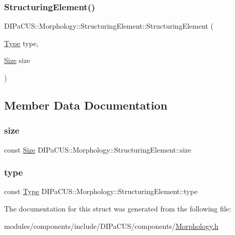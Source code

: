 \subsubsection{\texorpdfstring{Structuring\+Element()}{StructuringElement()}}
{\footnotesize\ttfamily D\+I\+Pa\+C\+U\+S\+::\+Morphology\+::\+Structuring\+Element\+::\+Structuring\+Element (\begin{DoxyParamCaption}\item[{\hyperlink{structDIPaCUS_1_1Morphology_1_1StructuringElement_a266d1fadc80f8b6ead0b9a38046db1a9}{Type}}]{type,  }\item[{\hyperlink{structDIPaCUS_1_1Morphology_1_1StructuringElement_ab516593fb61afbb06be48f756af85b56}{Size}}]{size }\end{DoxyParamCaption})\hspace{0.3cm}{\ttfamily [inline]}}



\subsection{Member Data Documentation}
\mbox{\label{structDIPaCUS_1_1Morphology_1_1StructuringElement_ade1c5c9095630d3f404a75b97f1ae825}} 
\subsubsection{\texorpdfstring{size}{size}}
{\footnotesize\ttfamily const \hyperlink{structDIPaCUS_1_1Morphology_1_1StructuringElement_ab516593fb61afbb06be48f756af85b56}{Size} D\+I\+Pa\+C\+U\+S\+::\+Morphology\+::\+Structuring\+Element\+::size}

\mbox{\label{structDIPaCUS_1_1Morphology_1_1StructuringElement_aea9961571fdde31c048b2b1bd59f296a}} 
\subsubsection{\texorpdfstring{type}{type}}
{\footnotesize\ttfamily const \hyperlink{structDIPaCUS_1_1Morphology_1_1StructuringElement_a266d1fadc80f8b6ead0b9a38046db1a9}{Type} D\+I\+Pa\+C\+U\+S\+::\+Morphology\+::\+Structuring\+Element\+::type}



The documentation for this struct was generated from the following file\+:\begin{DoxyCompactItemize}
\item 
modules/components/include/\+D\+I\+Pa\+C\+U\+S/components/\hyperlink{Morphology_8h}{Morphology.\+h}\end{DoxyCompactItemize}
